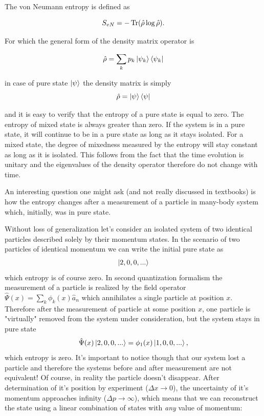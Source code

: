 \documentclass[a4paper,12pt]{article}
\begin{document}
The von Neumann entropy is defined as 

\begin{equation}
  S_{vN}= -\Tr(\hat{\rho} \log{\hat{\rho}}).
\end{equation}

For which the general form of the density matrix operator is

\begin{equation}
	\hat{\rho}=\sum_k p_k \ket{\psi_k}\bra{\psi_k} 
\end{equation}

in case of pure state $\ket{\psi}$ the density matrix is simply
\begin{equation}
  \hat{\rho} = \ket{\psi}\bra{\psi}
\end{equation}

and it is easy to verify that the entropy of a pure state is equal to zero. The entropy of mixed state is always greater than zero.
If the system is in a pure state, it will continue to be in a pure state as long as it stays isolated. For a mixed state, the degree of mixedness measured by the entropy will stay constant as long as it is isolated. This follows from the fact that the time evolution is unitary and the eigenvalues of the density operator therefore do not change with time.

An interesting question one might ask (and not really discussed in textbooks) is how the entropy changes after a measurement of a particle in many-body system which, initially, was in pure state.

Without loss of generalization let's consider an isolated system of two identical particles described solely by their momentum states.
In the scenario of two particles of identical momentum we can write the initial pure state as 
\begin{equation}
  \ket{2,0,0,...}
\end{equation}
which entropy is of course zero.  
In second quantization formalism the measurement of a particle is realized by the field operator $ \hat{\Psi}(x) =\sum_k \phi_k(x)\hat{a}_n$ which annihilates a single particle at position $x$.
Therefore after the measurement of particle at some position $x$, one particle is "virtually" removed from the system under consideration, but the system stays in pure state
\begin{equation}
  \hat{\Psi}(x)\ket{2,0,0,...}=\phi_1(x)\ket{1,0,0,...},
\end{equation}
which entropy is zero. It's important to notice though that our system lost a particle and therefore the systems before and after measurement are not equivalent! Of course, in reality the particle doesn't disappear. After determination of it's position by experiment ($\Delta x \to 0$), the uncertainty of it's momentum approaches infinity ($\Delta p \to \infty$), which means that we can reconstruct the state using a linear combination of states with \textit{any} value of momentum:
\end{document}
